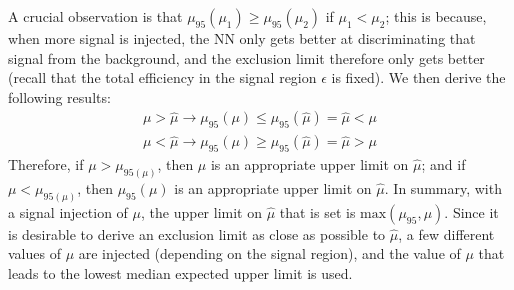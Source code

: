 A crucial observation is that $\mu_{95}(\mu_1) \ge \mu_{95}(\mu_2)$ if $\mu_1<\mu_2$; this is because, when more signal is injected, the NN only gets better at discriminating that signal from the background, and the exclusion limit therefore only gets better (recall that the total efficiency in the signal region $\epsilon$ is fixed).
We then derive the following results:
\begin{align}
  \mu > \hat{\mu} \rightarrow \mu_{95}(\mu) \le \mu_{95}(\hat{\mu}) = \hat{\mu} < \mu \\
  \mu < \hat{\mu} \rightarrow \mu_{95}(\mu) \ge \mu_{95}(\hat{\mu}) = \hat{\mu} > \mu
\end{align}
Therefore, if $\mu>\mu_{95(\mu)}$, then $\mu$ is an appropriate upper limit on $\hat{\mu}$; and if $\mu<\mu_{95(\mu)}$, then $\mu_{95}(\mu)$ is an appropriate upper limit on $\hat{\mu}$.
In summary, with a signal injection of $\mu$, the upper limit on $\hat{\mu}$ that is set is $\text{max}\left(\mu_{95},\mu\right)$.
Since it is desirable to derive an exclusion limit as close as possible to $\hat{\mu}$, a few different values of $\mu$ are injected (depending on the signal region), and the value of $\mu$ that leads to the lowest median expected upper limit is used.



